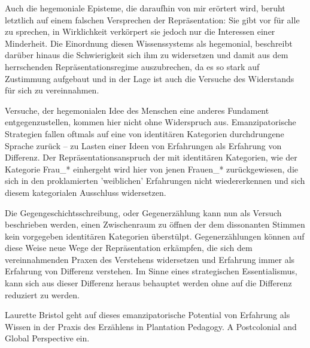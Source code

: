   Auch die hegemoniale Episteme, die daraufhin von
  mir erörtert wird, beruht letztlich auf einem falschen Versprechen der
  Repräsentation: Sie gibt vor für alle zu sprechen,  in Wirklichkeit
  verkörpert sie jedoch nur die Interessen einer Minderheit.  Die Einordnung
  diesen Wissenssystems als hegemonial, beschreibt darüber hinaus die
  Schwierigkeit sich ihm zu widersetzen und damit aus dem herrschenden
  Repräsentationsregime auszubrechen, da es so stark auf  Zustimmung aufgebaut
  und in der Lage ist auch die Versuche des Widerstands für sich zu
  vereinnahmen.

  Versuche, der hegemonialen Idee des  Menschen eine anderes Fundament
  entgegenzustellen,  kommen hier nicht ohne Widerspruch aus. Emanzipatorische
  Strategien fallen oftmals auf eine von identitären Kategorien durchdrungene
  Sprache zurück – zu Lasten einer Ideen von Erfahrungen als Erfahrung von
  Differenz. Der Repräsentationsanspruch der mit identitären Kategorien, wie
  der Kategorie Frau\_* einhergeht wird hier von jenen Frauen\_* zurückgewiesen,
  die sich in den proklamierten 'weiblichen' Erfahrungen nicht wiedererkennen
  und sich diesem kategorialen Ausschluss widersetzen.

  Die Gegengeschichtsschreibung, oder Gegenerzählung kann nun als Versuch
  beschrieben werden, einen Zwischenraum zu öffnen der dem dissonanten Stimmen
  kein vorgegeben identitären Kategorien überstülpt. Gegenerzählungen  können
  auf diese Weise neue Wege der Repräsentation erkämpfen, die sich dem
  vereinnahmenden Praxen des Verstehens widersetzen und Erfahrung immer als
  Erfahrung von Differenz verstehen. Im Sinne eines strategischen
  Essentialismus, kann sich aus dieser Differenz heraus behauptet werden ohne
  auf die Differenz reduziert zu werden.
 
  Laurette Bristol geht auf dieses emanzipatorische Potential von Erfahrung als
  Wissen in der Praxis des Erzählens  in  \glqq Plantation Pedagogy. A Postcolonial
  and Global Perspective \grqq \footnotemark {} ein.

